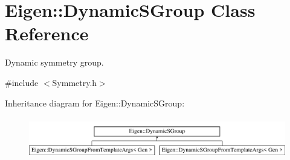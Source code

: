 \hypertarget{class_eigen_1_1_dynamic_s_group}{}\section{Eigen\+:\+:Dynamic\+S\+Group Class Reference}
\label{class_eigen_1_1_dynamic_s_group}


Dynamic symmetry group.  




{\ttfamily \#include $<$Symmetry.\+h$>$}

Inheritance diagram for Eigen\+:\+:Dynamic\+S\+Group\+:\begin{figure}[H]
\begin{center}
\leavevmode
\includegraphics[height=1.848185cm]{class_eigen_1_1_dynamic_s_group}
\end{center}
\end{figure}

